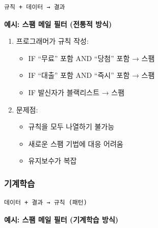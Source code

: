 \documentclass[a4paper, 11pt]{article}
\providecommand{\tightlist}{%
  \setlength{\itemsep}{0pt}\setlength{\parskip}{0pt}}
\begin{document}
\begin{verbatim}
규칙 + 데이터 → 결과
\end{verbatim}

\textbf{예시: 스팸 메일 필터 (전통적 방식)}

\begin{enumerate}
\def\labelenumi{\arabic{enumi}.}
\tightlist
\item
  프로그래머가 규칙 작성:

  \begin{itemize}
  \tightlist
  \item
    IF ``무료'' 포함 AND ``당첨'' 포함 → 스팸
  \item
    IF ``대출'' 포함 AND ``즉시'' 포함 → 스팸
  \item
    IF 발신자가 블랙리스트 → 스팸
  \end{itemize}
\item
  문제점:

  \begin{itemize}
  \tightlist
  \item
    규칙을 모두 나열하기 불가능
  \item
    새로운 스팸 기법에 대응 어려움
  \item
    유지보수가 복잡
  \end{itemize}
\end{enumerate}

\hypertarget{uxae30uxacc4uxd559uxc2b5}{%
\subsubsection{기계학습}\label{uxae30uxacc4uxd559uxc2b5}}

\begin{verbatim}
데이터 + 결과 → 규칙 (패턴)
\end{verbatim}

\textbf{예시: 스팸 메일 필터 (기계학습 방식)}
\end{document}
